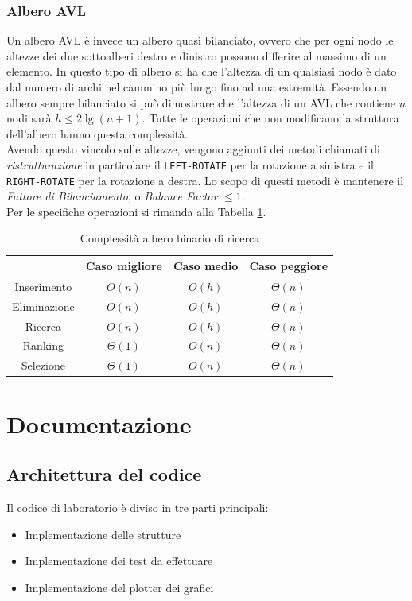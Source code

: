 \subsubsection*{Albero AVL}
Un albero AVL è invece un albero quasi bilanciato, ovvero che per ogni nodo le altezze dei due sottoalberi destro e dinistro possono differire al massimo di un elemento. In questo tipo di albero si ha che l'altezza di un qualsiasi nodo è dato dal numero di archi nel cammino più lungo fino ad una estremità.
Essendo un albero sempre bilanciato si può dimostrare che l'altezza di un AVL che contiene $n$ nodi sarà $h \leq 2 \lg(n + 1)$. Tutte le operazioni che non modificano la struttura dell'albero hanno questa complessità.\\
Avendo questo vincolo sulle altezze, vengono aggiunti dei metodi chiamati di \textit{ristrutturazione} in particolare il \texttt{LEFT-ROTATE} per la rotazione a sinistra e il \texttt{RIGHT-ROTATE} per la rotazione a destra. Lo scopo di questi metodi è mantenere il \textit{Fattore di Bilanciamento}, o \textit{Balance Factor} $\leq 1$. \\
Per le specifiche operazioni si rimanda alla Tabella \ref{tab:complessita_albero_avl}.

\begin{table}[h!]
	\centering
	\begin{tabular}{ |c||c|c|c|  }
		\hhline{~---}
		\multicolumn{1}{c|}{} & Caso migliore & Caso medio & Caso peggiore \\
		\hline
		Inserimento & $O(n)$ & $O(h)$ & $\Theta(n)$\\
		\hline
		Eliminazione & $O(n)$ & $O(h)$ & $\Theta(n)$\\
		\hline
		Ricerca & $O(n)$ & $O(h)$ & $\Theta(n)$\\
		\hline
		Ranking & $\Theta(1)$ & $O(n)$ & $\Theta(n)$\\
		\hline
		Selezione & $\Theta(1)$ & $O(n)$ & $\Theta(n)$\\
		\hline
	\end{tabular}
	\caption{Complessità albero binario di ricerca}
	\label{tab:complessita_albero_avl}
\end{table}

\newpage

\section{Documentazione}
\subsection{Architettura del codice}
Il codice di laboratorio è diviso in tre parti principali: 
\begin{itemize}
	\item Implementazione delle strutture
	\item Implementazione dei test da effettuare
	\item Implementazione del plotter dei grafici
\end{itemize}


